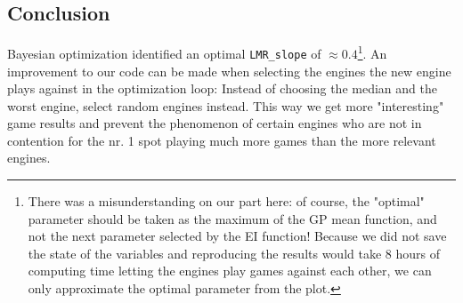 \subsection{Conclusion}
Bayesian optimization identified an optimal \texttt{LMR\_slope} of $\approx 0.4$\footnote{There was a misunderstanding on our part here: of course, the "optimal" parameter should be taken as the maximum of the GP mean function, and not the next parameter selected by the EI function! Because we did not save the state of the variables and reproducing the results would take 8 hours of computing time letting the engines play games against each other, we can only approximate the optimal parameter from the plot.}.  An improvement to our code can be made when selecting the engines the new engine plays against in the optimization loop: Instead of choosing the median and the worst engine, select random engines instead. This way we get more "interesting" game results and prevent the phenomenon of certain engines who are not in contention for the nr. 1 spot playing much more games than the more relevant engines.